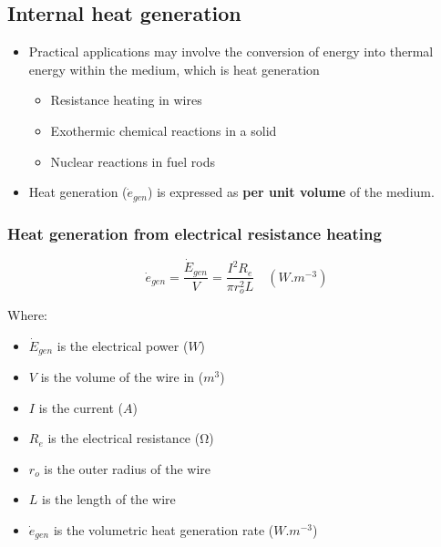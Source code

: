 \documentclass[11pt]{article}
\begin{document}
\subsection{Internal heat generation}
\label{sec:orgd277454}
\begin{itemize}
\item Practical applications may involve the conversion of energy into thermal energy within the medium, which is heat generation
\begin{itemize}
\item Resistance heating in wires
\item Exothermic chemical reactions in a solid
\item Nuclear reactions in fuel rods
\end{itemize}
\item Heat generation (\(\dot{e}_{gen}\)) is expressed as \textbf{per unit volume} of the medium.
\end{itemize}

 \newpage

\subsubsection{Heat generation from electrical resistance heating}
\label{sec:org440e27f}
\[\dot{e}_{gen} = \frac{\dot{E}_{gen}}{V} = \frac{I^2 R_e}{\pi r_o^2 L} \quad (\unit{W.m^{-3}})\]

Where:
\begin{itemize}
\item \(\dot{E}_{gen}\) is the electrical power (\(\unit{W}\))
\item \(V\) is the volume of the wire in (\(\unit{m^3}\))
\item \(I\) is the current (\(\unit{A}\))
\item \(R_e\) is the electrical resistance (\(\unit{\ohm}\))
\item \(r_o\) is the outer radius of the wire
\item \(L\) is the length of the wire
\item \(\dot{e}_{gen}\) is the volumetric heat generation rate (\(\unit{W.m^{-3}}\))
\end{itemize}

 \newpage
\end{document}
